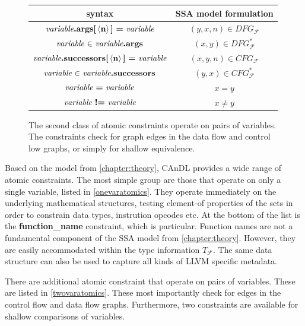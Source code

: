\begin{figure}[t]
  \centering
  \begin{tabular}{|c|c|}
    \hline
    syntax & SSA model formulation \\
    \hline
    \hline
    $\text{\it variable}\text{\bf.args[}\left<\text{\bf n}\right>\text{\bf]}\ \text{\bf =}\ \text{\it variable}$ & $(y,x,n)\in DFG_\mathcal F$\\
    $\text{\it variable}\ \text{\bf $\in$}\ \text{\it variable}\text{\bf .args}$ & $(x,y)\in DFG_\mathcal F^*$\\
    \hline
    $\text{\it variable}\text{\bf.successors[}\left<\text{\bf n}\right>\text{\bf]}\ \text{\bf =}\ \text{\it variable}$ & $(x,y,n)\in CFG_\mathcal F$\\
    $\text{\it variable}\ \text{\bf $\in$}\ \text{\it variable}\text{\bf .successors}$ & $(y,x)\in CFG_\mathcal F^*$\\
    \hline
    $\text{\it variable}\ \text{\bf =}\ \text{\it variable}$ & $x=y$\\
    $\text{\it variable}\ \text{\bf !=}\ \text{\it variable}$ & $x\neq y$\\
    \hline
  \end{tabular}
  \caption{The second class of atomic constraints operate on pairs of variables.
           The constraints check for graph edges in the
           data flow and control low graphs, or simply for shallow equivalence.}
  \label{twovaratomics}
\end{figure}

    Based on the model from \autoref{chapter:theory}, CAnDL provides a wide
    range of atomic constraints.
    The most simple group are those that operate on only a single variable,
    listed in \autoref{onevaratomics}.
    They operate immediately on the underlying mathematical structures, testing
    element-of properties of the sets in order to constrain data types,
    instrution opcodes etc.
    At the bottom of the list is the {\bf function\_name} constraint,
    which is particular.
    Function names are not a fundamental component of the SSA model from
    \autoref{chapter:theory}.
    However, they are easily accommodated within the type information
    $T_\mathcal F$.
    The same data structure can also be used to capture all kinds of LLVM
    specific metadata.

    There are additional atomic constraint that operate on pairs of variables.
    These are listed in \autoref{twovaratomics}.
    These most importantly check for edges in the control flow and data flow
    graphs.
    Furthermore, two constraints are available for shallow comparisons of
    variables.


